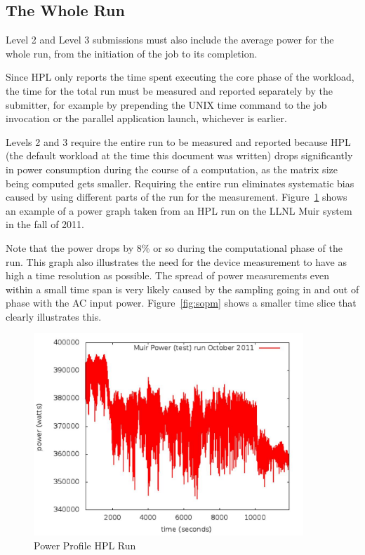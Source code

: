 \subsection{The Whole Run}
\noindent
Level 2 and Level 3 submissions must also include the average power for the whole run, from the initiation of the job to its completion. 
\wl

\noindent
Since HPL only reports the time spent executing the core phase of the workload, the time for the total run must be measured and reported separately by the submitter, for example by prepending the UNIX time command to the job invocation or the parallel application launch, whichever is earlier.
\wl

\noindent
Levels 2 and 3 require the entire run to be measured and reported because HPL (the default workload at the time this document was written) drops significantly in power consumption during the course of a computation, as the matrix size being computed gets smaller.  Requiring the entire run eliminates systematic bias caused by using different parts of the run for the measurement. Figure~\ref{fig:powprof} shows an example of a power graph taken from an HPL run on the LLNL Muir system in the fall of 2011.
\wl

\noindent
Note that the power drops by 8\% or so during the computational phase of the run.  This graph also illustrates the need for the device measurement to have as high a time resolution as possible.  The spread of power measurements even within a small time span is very likely caused by the sampling going in and out of phase with the AC input power. Figure~\ref{fig:sopm} shows a smaller time slice that clearly illustrates this.
\wl


\begin{figure}
\centering
\includegraphics[width=4in]{fig3-1}
\caption{Power Profile HPL Run}
\label{fig:powprof}
\end{figure}

